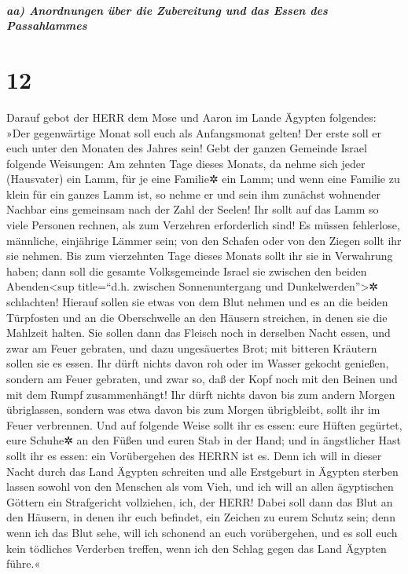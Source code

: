 \hypertarget{aa-anordnungen-uxfcber-die-zubereitung-und-das-essen-des-passahlammes}{%
\subparagraph{aa) Anordnungen über die Zubereitung und das Essen des
Passahlammes}\label{aa-anordnungen-uxfcber-die-zubereitung-und-das-essen-des-passahlammes}}

\hypertarget{section-11}{%
\section{12}\label{section-11}}

 Darauf gebot der HERR dem Mose und Aaron im Lande Ägypten
folgendes:  »Der gegenwärtige Monat soll euch als
Anfangsmonat gelten! Der erste soll er euch unter den Monaten des Jahres
sein!  Gebt der ganzen Gemeinde Israel folgende Weisungen:
Am zehnten Tage dieses Monats, da nehme sich jeder (Hausvater) ein Lamm,
für je eine Familie✲ ein Lamm;  und wenn eine Familie zu
klein für ein ganzes Lamm ist, so nehme er und sein ihm zunächst
wohnender Nachbar eins gemeinsam nach der Zahl der Seelen! Ihr sollt auf
das Lamm so viele Personen rechnen, als zum Verzehren erforderlich sind!
 Es müssen fehlerlose, männliche, einjährige Lämmer sein;
von den Schafen oder von den Ziegen sollt ihr sie nehmen. 
Bis zum vierzehnten Tage dieses Monats sollt ihr sie in Verwahrung
haben; dann soll die gesamte Volksgemeinde Israel sie zwischen den
beiden Abenden\textless sup title=``d.h. zwischen Sonnenuntergang und
Dunkelwerden''\textgreater✲ schlachten!  Hierauf sollen
sie etwas von dem Blut nehmen und es an die beiden Türpfosten und an die
Oberschwelle an den Häusern streichen, in denen sie die Mahlzeit halten.
 Sie sollen dann das Fleisch noch in derselben Nacht
essen, und zwar am Feuer gebraten, und dazu ungesäuertes Brot; mit
bitteren Kräutern sollen sie es essen.  Ihr dürft nichts
davon roh oder im Wasser gekocht genießen, sondern am Feuer gebraten,
und zwar so, daß der Kopf noch mit den Beinen und mit dem Rumpf
zusammenhängt!  Ihr dürft nichts davon bis zum andern
Morgen übriglassen, sondern was etwa davon bis zum Morgen übrigbleibt,
sollt ihr im Feuer verbrennen.  Und auf folgende Weise
sollt ihr es essen: eure Hüften gegürtet, eure Schuhe✲ an den Füßen und
euren Stab in der Hand; und in ängstlicher Hast sollt ihr es essen: ein
Vorübergehen des HERRN ist es.  Denn ich will in dieser
Nacht durch das Land Ägypten schreiten und alle Erstgeburt in Ägypten
sterben lassen sowohl von den Menschen als vom Vieh, und ich will an
allen ägyptischen Göttern ein Strafgericht vollziehen, ich, der HERR!
 Dabei soll dann das Blut an den Häusern, in denen ihr
euch befindet, ein Zeichen zu eurem Schutz sein; denn wenn ich das Blut
sehe, will ich schonend an euch vorübergehen, und es soll euch kein
tödliches Verderben treffen, wenn ich den Schlag gegen das Land Ägypten
führe.«

